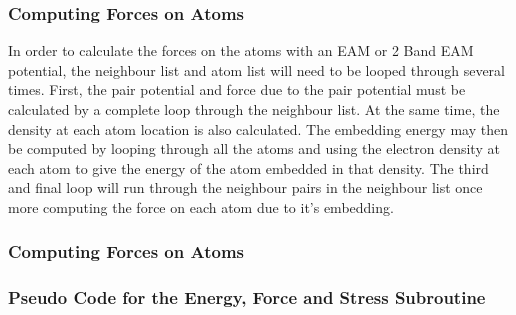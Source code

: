 \documentclass[12pt,twoside]{manual}
\begin{document}
\subsubsection{Computing Forces on Atoms}

In order to calculate the forces on the atoms with an EAM or 2 Band EAM potential, the neighbour list and atom list will need to be looped through several times.  First, the pair potential and force due to the pair potential must be calculated by a complete loop through the neighbour list.  At the same time, the density at each atom location is also calculated.  The embedding energy may then be computed by looping through all the atoms and using the electron density at each atom to give the energy of the atom embedded in that density.  The third and final loop will run through the neighbour pairs in the neighbour list once more computing the force on each atom due to it's embedding.


\subsubsection{Computing Forces on Atoms}

\subsubsection{Pseudo Code for the Energy, Force and Stress Subroutine}
\end{document}
